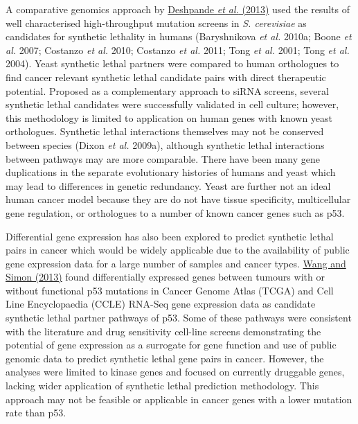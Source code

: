 A comparative genomics approach by \hyperlink{ENREF30}{Deshpande}\hyperlink{ENREF30}{\textit{ et al.}}\hyperlink{ENREF30}{ (2013)} used the results of well characterised high-throughput mutation screens in \textit{S. cerevisiae }as candidates for synthetic lethality in humans (Baryshnikova\textit{ et al.} 2010a; Boone\textit{ et al.} 2007; Costanzo\textit{ et al.} 2010; Costanzo\textit{ et al.} 2011; Tong\textit{ et al.} 2001; Tong\textit{ et al.} 2004). Yeast synthetic lethal partners were compared to human orthologues to find cancer relevant synthetic lethal candidate pairs with direct therapeutic potential. Proposed as a complementary approach to siRNA screens, several synthetic lethal candidates were successfully validated in cell culture; however, this methodology is limited to application on human genes with known yeast orthologues. Synthetic lethal interactions themselves may not be conserved between species (Dixon\textit{ et al.} 2009a), although synthetic lethal interactions between pathways may are more comparable. There have been many gene duplications in the separate evolutionary histories of humans and yeast which may lead to differences in genetic redundancy. Yeast are further not an ideal human cancer model because they are do not have tissue specificity, multicellular gene regulation, or orthologues to a number of known cancer genes such as p53.  

Differential gene expression has also been explored to predict synthetic lethal pairs in cancer which would be widely applicable due to the availability of public gene expression data for a large number of samples and cancer types. \hyperlink{ENREF109}{Wang and Simon (2013)} found differentially expressed genes between tumours with or without functional p53 mutations in Cancer Genome Atlas (TCGA) and Cell Line Encyclopaedia (CCLE) RNA-Seq gene expression data as candidate synthetic lethal partner pathways of p53. Some of these pathways were consistent with the literature and drug sensitivity cell-line screens demonstrating the potential of gene expression as a surrogate for gene function and use of public genomic data to predict synthetic lethal gene pairs in cancer. However, the analyses were limited to kinase genes and focused on currently druggable genes, lacking wider application of synthetic lethal prediction methodology. This approach may not be feasible or applicable in cancer genes with a lower mutation rate than p53.  

